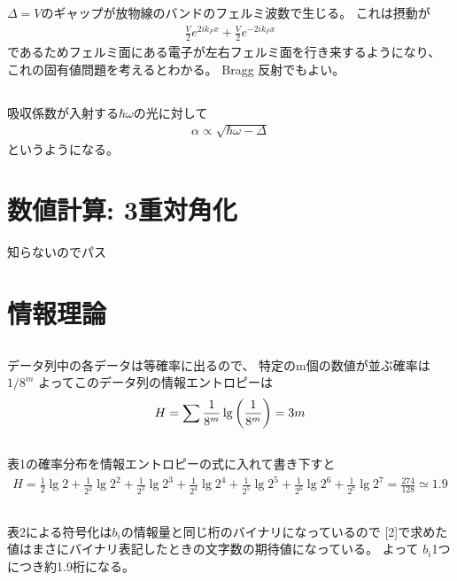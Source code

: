 \documentclass[../../master.tex]{subfiles}
\begin{document}
\section{}
\(\Delta = V\)のギャップが放物線のバンドのフェルミ波数で生じる。
これは摂動が
\begin{align}
    \frac{V}{2}e^{2ik_Fx} + \frac{V}{2}e^{-2ik_Fx}
\end{align}
であるためフェルミ面にある電子が左右フェルミ面を行き来するようになり、
これの固有値問題を考えるとわかる。
Bragg 反射でもよい。

\section{}
吸収係数が入射する\(\hbar\omega\)の光に対して
\begin{align}
    \alpha \propto \sqrt{\hbar\omega -\Delta}
\end{align}
というようになる。

\chapter{数値計算: 3重対角化}
知らないのでパス

\chapter{情報理論}
\section{}
データ列中の各データは等確率に出るので、
特定のm個の数値が並ぶ確率は\(1/8^m\)
よってこのデータ列の情報エントロピーは
\begin{align}
    H =\sum \frac{1}{8^m}\lg\qty(\frac{1}{8^m}) = 3m
\end{align}

\section{}
表1の確率分布を情報エントロピーの式に入れて書き下すと
\begin{align}
    H = \frac{1}{2}\lg2
    +\frac{1}{2^2}\lg2^2
    +\frac{1}{2^3}\lg2^3
    +\frac{1}{2^4}\lg2^4
    +\frac{1}{2^5}\lg2^5
    +\frac{1}{2^6}\lg2^6
    +\frac{1}{2^7}\lg2^7
    =\frac{274}{128}\simeq 1.9
\end{align}
\section{}
表2による符号化は\(b_i\)の情報量と同じ桁のバイナリになっているので
[2]で求めた値はまさにバイナリ表記したときの文字数の期待値になっている。
よって \(b_i\)1つにつき約1.9桁になる。
\end{document}

